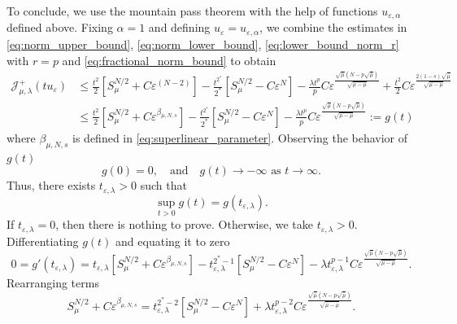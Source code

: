 \documentclass[11pt]{article}
\newcommand{\al} {\alpha}
\newcommand{\la} {\lambda}
\newcommand{\Jplus}{\mathcal{J}_{\mu,\lambda}^{+}} %
\begin{document}
To conclude, we use the mountain pass theorem with the help of functions $u_{\varepsilon,\al}$ defined above. Fixing $\al =1$ and defining $u_{\varepsilon} = u_{\varepsilon, \alpha}$, we combine the estimates in \eqref{eq:norm_upper_bound}, \eqref{eq:norm_lower_bound}, \eqref{eq:lower_bound_norm_r} with $r = p$ and \eqref{eq:fractional_norm_bound} to obtain
\begin{equation*}
\begin{aligned}
\Jplus(t u_{\varepsilon}) &  \leq \frac{t^2}{2} \left[ S_{\mu}^{N/2} + C \varepsilon^{(N-2)}  \right] - \frac{t^{2^*}}{2^*}\left[ S_{\mu}^{N/2} - C \varepsilon^{ N}  \right] -\frac{\la t^{p}}{p} C \varepsilon^{\frac{ \sqrt{\bar{\mu}} {(N - p\sqrt{\bar{\mu}})}}{{\sqrt{\bar{\mu} - \mu}}}} + \frac{t^2}{2} C \varepsilon ^{ \frac{2  (1-s)\sqrt{\bar{\mu}}}{\sqrt{\bar{\mu} - \mu}}}\\
& \leq \frac{t^2}{2} \left[ S_{\mu}^{N/2} + C \varepsilon^{\beta_{\mu,N,s}}  \right] - \frac{t^{2^*}}{2^*}\left[ S_{\mu}^{N/2} - C \varepsilon^{ N}  \right] -\frac{\la t^{p}}{p} C \varepsilon^{\frac{ \sqrt{\bar{\mu}} {(N - p\sqrt{\bar{\mu}})}}{{\sqrt{\bar{\mu} - \mu}}}} := g(t)
\end{aligned}
\end{equation*}
where $\beta_{\mu,N,s}$ is defined in \eqref{eq:superlinear_parameter}.
Observing the behavior of \( g(t) \)
\begin{equation*}
g(0) = 0, \quad \text{and} \quad g(t) \to -\infty \text{ as } t \to \infty.
\end{equation*}
Thus, there exists \( t_{\varepsilon, \lambda} > 0 \) such that
\begin{equation*}
\sup_{t > 0} g(t) = g(t_{\varepsilon, \lambda}).
\end{equation*}
If \( t_{\varepsilon, \lambda} = 0 \), then there is nothing to prove. Otherwise, we take \( t_{\varepsilon, \lambda} > 0 \).
Differentiating \( g(t) \) and equating it to zero
\begin{equation*}
0 = g'(t_{\varepsilon, \lambda}) = t_{\varepsilon, \lambda} \left[ S_{\mu}^{N/2} + C \varepsilon^{\beta_{\mu,N,s}} \right] - t_{\varepsilon, \lambda}^{2^*-1} \left[ S_{\mu}^{N/2} - C \varepsilon^{ N} \right] - \lambda t_{\varepsilon, \lambda}^{p-1} C \varepsilon^{\frac{ \sqrt{\bar{\mu}} {(N - p\sqrt{\bar{\mu}})}}{{\sqrt{\bar{\mu} - \mu}}}}.
\end{equation*}
Rearranging terms
\begin{equation}\label{eq:g_derivative_0}
S_{\mu}^{N/2} + C \varepsilon^{ \beta_{\mu,N,s}} = t_{\varepsilon, \lambda}^{2^*-2} \left[ S_{\mu}^{N/2} - C \varepsilon^{ N} \right] + \lambda t_{\varepsilon, \lambda}^{p-2} C \varepsilon^{\frac{ \sqrt{\bar{\mu}} {(N - p\sqrt{\bar{\mu}})}}{{\sqrt{\bar{\mu} - \mu}}}}.
\end{equation}
\end{document}
